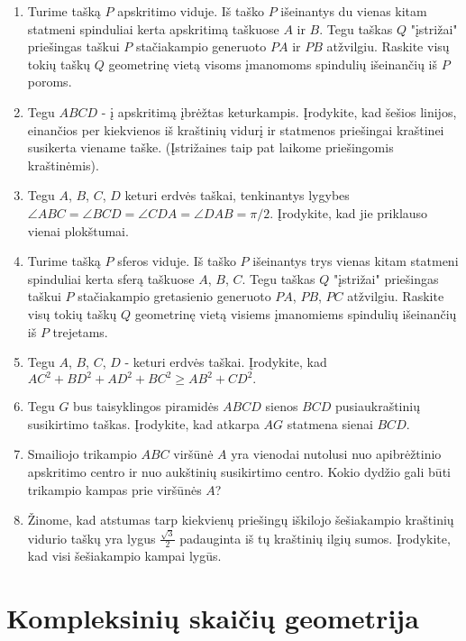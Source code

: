 \begin{enumerate}
\item Turime tašką $P$ apskritimo viduje. Iš taško $P$ išeinantys du vienas kitam statmeni spinduliai kerta apskritimą taškuose $A$ ir $B$. Tegu taškas $Q$ "įstrižai" priešingas taškui $P$ stačiakampio generuoto $PA$ ir $PB$ atžvilgiu. Raskite visų tokių taškų $Q$ geometrinę vietą visoms įmanomoms spindulių išeinančių iš $P$ poroms.

\item Tegu $ABCD$ - į apskritimą įbrėžtas keturkampis. Įrodykite, kad šešios linijos, einančios per kiekvienos iš kraštinių vidurį ir statmenos priešingai kraštinei susikerta viename taške. (Įstrižaines taip pat laikome priešingomis kraštinėmis).

\item Tegu $A$, $B$, $C$, $D$ keturi erdvės taškai, tenkinantys lygybes $\angle ABC = \angle BCD = \angle CDA = \angle DAB = \pi/2.$ Įrodykite, kad jie priklauso vienai plokštumai.

\item Turime tašką $P$ sferos viduje. Iš taško $P$ išeinantys trys vienas kitam statmeni spinduliai kerta sferą taškuose $A$, $B$, $C$. Tegu taškas $Q$ "įstrižai" priešingas taškui $P$ stačiakampio gretasienio generuoto $PA$, $PB$, $PC$ atžvilgiu. Raskite visų tokių taškų $Q$ geometrinę vietą visiems įmanomiems spindulių išeinančių iš $P$ trejetams.

\item Tegu $A$, $B$, $C$, $D$ - keturi erdvės taškai. Įrodykite, kad $AC^2 + BD^2 + AD^2 + BC^2 \geq AB^2 + CD^2.$

\item Tegu $G$ bus taisyklingos piramidės $ABCD$ sienos $BCD$ pusiaukraštinių susikirtimo taškas. Įrodykite, kad atkarpa $AG$ statmena sienai $BCD$. 

\item Smailiojo trikampio $ABC$ viršūnė $A$ yra vienodai nutolusi nuo apibrėžtinio apskritimo centro ir nuo aukštinių susikirtimo centro. Kokio dydžio gali būti trikampio kampas prie viršūnės $A$? 

\item Žinome, kad atstumas tarp kiekvienų priešingų iškilojo šešiakampio kraštinių vidurio taškų yra lygus $\frac{\sqrt{3}}{2}$ padauginta iš tų kraštinių ilgių sumos. Įrodykite, kad visi šešiakampio kampai lygūs.

\end{enumerate}


\section{Kompleksinių skaičių geometrija}

